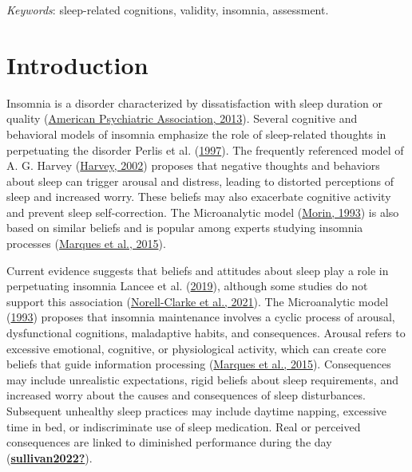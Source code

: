 \documentclass[
  ,doc,11pt, twoside,floatsintext]{apa6}
\begin{document}
\begin{flushleft}
\emph{Keywords}: sleep-related cognitions, validity, insomnia, assessment.
\end{flushleft}

\newpage

\hypertarget{introduction}{%
\section{Introduction}\label{introduction}}

Insomnia is a disorder characterized by dissatisfaction with sleep duration or quality (\protect\hyperlink{ref-americanpsychiatricassociation2013}{American Psychiatric Association, 2013}). Several cognitive and behavioral models of insomnia emphasize the role of sleep-related thoughts in perpetuating the disorder Perlis et al. (\protect\hyperlink{ref-perlis1997}{1997}). The frequently referenced model of A. G. Harvey (\protect\hyperlink{ref-harvey2002}{Harvey, 2002}) proposes that negative thoughts and behaviors about sleep can trigger arousal and distress, leading to distorted perceptions of sleep and increased worry. These beliefs may also exacerbate cognitive activity and prevent sleep self-correction. The Microanalytic model (\protect\hyperlink{ref-morin1993insomnia}{Morin, 1993}) is also based on similar beliefs and is popular among experts studying insomnia processes (\protect\hyperlink{ref-marques2015}{Marques et al., 2015}).

Current evidence suggests that beliefs and attitudes about sleep play a role in perpetuating insomnia Lancee et al. (\protect\hyperlink{ref-lancee2019}{2019}), although some studies do not support this association (\protect\hyperlink{ref-norell-clarke2021}{Norell-Clarke et al., 2021}). The Microanalytic model (\protect\hyperlink{ref-morin1993}{1993}) proposes that insomnia maintenance involves a cyclic process of arousal, dysfunctional cognitions, maladaptive habits, and consequences. Arousal refers to excessive emotional, cognitive, or physiological activity, which can create core beliefs that guide information processing (\protect\hyperlink{ref-marques2015}{Marques et al., 2015}). Consequences may include unrealistic expectations, rigid beliefs about sleep requirements, and increased worry about the causes and consequences of sleep disturbances. Subsequent unhealthy sleep practices may include daytime napping, excessive time in bed, or indiscriminate use of sleep medication. Real or perceived consequences are linked to diminished performance during the day (\protect\hyperlink{ref-sullivan2022}{\textbf{sullivan2022?}}).
\end{document}
